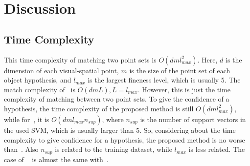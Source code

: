 \documentclass[paper]{ieice}
\begin{document}

\section{Discussion}
\label{dis5}
\subsection{Time Complexity}
This time complexity of matching two point sets is $O(dml_{max}^2)$. Here, $d$ is the dimension of each visual-spatial point, $m$ is the size of the point set of each object hypothesis, and $l_{max}$ is the largest fineness level, which is usually 5. The match complexity of~\cite{pmk} is $O(dmL), L=l_{max}$. However, this is just the time complexity of matching between two point sets. To give the confidence of a hypothesis, the time complexity of the proposed method is still $O(dml_{max}^2)$, while for~\cite{pmk}, it is $O(dml_{max}n_{sup})$, where $n_{sup}$ is the number of support vectors in the used SVM, which is usually larger than 5. So, considering about the time complexity to give confidence for a hypothesis, the proposed method is no worse than~\cite{pmk}. Also $n_{sup}$ is related to the training dataset, while $l_{max}$ is less related. The case of ~\cite{spmk} is almost the same with~\cite{pmk}.
\end{document}

